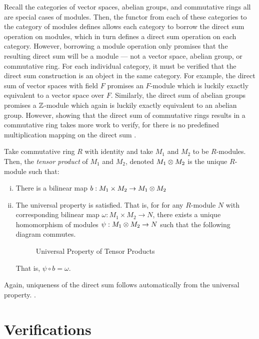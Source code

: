 \documentclass[../sean_thesis.tex]{subfiles}
\begin{document}
Recall the categories of vector spaces, abelian groups, and commutative rings all are special cases of modules. Then, the functor from each of these categories to the category of modules defines allows each category to borrow the direct sum operation on modules, which in turn defines a direct sum operation on each category. However, borrowing a module operation only promises that the resulting direct sum will be a module --- not a vector space, abelian group, or commutative ring. For each individual category, it must be verified that the direct sum construction is an object in the same category. For example, the direct sum of vector spaces with field $F$ promises an $F$-module which is luckily exactly equivalent to a vector space over $F$. Similarly, the direct sum of abelian groups promises a $\mathbb{Z}$-module which again is luckily exactly equivalent to an abelian group. However, showing that the direct sum of commutative rings results in a commutative ring takes more work to verify, for there is no predefined multiplication mapping on the direct sum .



\begin{definition}
	Take commutative ring $R$ with identity and take $M_1$ and $M_2$ to be $R$-modules. Then, the \emph{tensor product} of $M_1$ and $M_2$, denoted $M_1 \otimes M_2$ is the unique $R$-module such that:
\vspace{-\varparskip}
	\begin{enumerate}[(i)]
		\item There is a bilinear map $b: M_1 \times M_2 \to M_1 \otimes M_2$
		\item The universal property is satisfied. That is, for for any $R$-module $N$ with corresponding bilinear map $\omega: M_1 \times M_2 \to N$, there exists a unique homomorphism of modules $\psi: M_1 \otimes M_2 \to N$ such that the following diagram commutes.
		\begin{figure}[ht!]
			
			\caption{Universal Property of Tensor Products}
			\label{fig:tensor_prod_univ_property}
		\end{figure}
		That is, $\psi \circ b = \omega$.
	\end{enumerate}
\end{definition}

Again, uniqueness of the direct sum follows automatically from the universal property. .


\section{Verifications}

\end{document}
